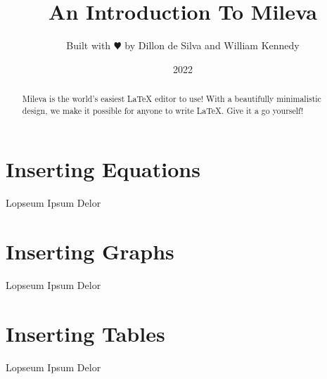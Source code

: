\documentclass{article}
\title{An Introduction To Mileva}
\author{Built with $\varheartsuit$ by Dillon de Silva and William Kennedy}
\date{2022}
\begin{document}
\maketitle

\begin{abstract}
Mileva is the world's easiest {\LaTeX} editor to use! With a beautifully
minimalistic design, we make it possible for anyone to write LaTeX. 
Give it a go yourself!
\end{abstract}

\section*{Inserting Equations}

Lopseum Ipsum Delor
  
\section*{Inserting Graphs}

Lopseum Ipsum Delor

\section*{Inserting Tables}

Lopseum Ipsum Delor
\end{document}
